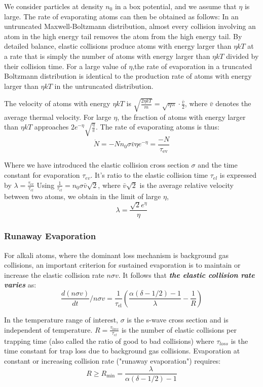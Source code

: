 \documentclass[12]{article}
\begin{document}
We consider particles at density $n_0$ in a box potential, and we assume that $\eta$ is large. The rate of evaporating atoms can then be obtained as follows: In an untruncated Maxwell-Boltzmann distribution, almost every collision involving an atom in the high energy tail removes the atom from the high energy tail. By detailed balance, elastic collisions produce atoms with energy larger than $\eta kT$ at a rate that is simply the number of atoms with energy larger than $\eta kT$ divided by their collision time. For a large value of $\eta$,the rate of evaporation in a truncated Boltzmann distribution is identical to the production rate of atoms with energy larger than $\eta kT$ in the untruncated distribution. 

The velocity of atoms with energy $\eta kT$ is $\sqrt{\frac{2\eta kT}{m}}=\sqrt{\eta \pi }\cdot \frac{\bar v}{2}$, where $\bar{v}$ denotes the average thermal velocity. For large $\eta$, the fraction of atoms with energy larger than $\eta kT$ approaches $2e^{-\eta} \sqrt{\frac{\eta}{\pi}}$. The rate of evaporating atoms is thus: $$ \dot{N}=-N n_0 \sigma \bar{v} \eta e^{-\eta}=\frac{-N}{\tau_{\mathrm{ev}}} $$

Where we have introduced the elastic collision cross section $\sigma$ and the time constant for evaporation $\tau_{ev}$.   It's ratio to the elastic collision time $\tau_{el} $ is expressed by $\lambda=\frac{\tau_{ev}}{\tau_{el}}$ Using $\frac{1}{\tau_{el}}=n_0 \sigma \bar{v} \sqrt{2}$, where $\bar{v}\sqrt{2}$ is the average relative velocity between two atoms, we obtain in the limit of large $\eta$, $$\lambda=\frac{\sqrt{2}e^\eta}{\eta}$$
\subsubsection{Runaway Evaporation}
For alkali atoms, where the dominant loss mechanism is background gas collisions, an important criterion for sustained evaporation is to maintain or increase the elastic collision rate $n \sigma v$. It follows that \textbf{\textit{the elastic collision rate varies}} as: $$ \frac{d(n \sigma v)}{d t} / n \sigma v=\frac{1}{\tau_{\mathrm{el}}}\left(\frac{\alpha(\delta-1 / 2)-1}{\lambda}-\frac{1}{R}\right)$$ 

In the temperature range of interest, $\sigma$ is the s-wave cross section and is independent of temperature. $R=\frac{\tau_{loss}}{\tau_{el}}$ is the number of elastic collisions per trapping time (also called the ratio of good to bad collisions) where $\tau_{loss} $ is the time constant for trap loss due to background gas collisions. Evaporation at constant or increasing collision rate ("runaway evaporation") requires: $$R \geq R_{\min }=\frac{\lambda}{\alpha(\delta-1 / 2)-1}$$
\end{document}
